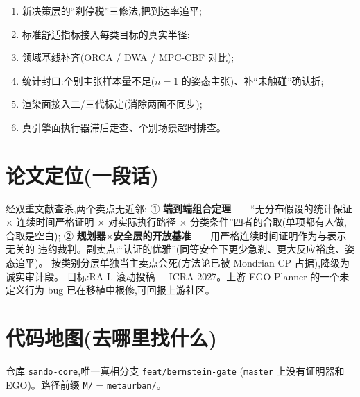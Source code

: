 \documentclass[11pt]{ctexart}
\newcommand{\code}[1]{\texttt{#1}}
\begin{document}
\begin{enumerate}
  \item 新决策层的``刹停税''三修法,把到达率追平;
  \item 标准舒适指标接入每类目标的真实半径;
  \item 领域基线补齐(ORCA / DWA / MPC-CBF 对比);
  \item 统计封口:个别主张样本量不足($n{=}1$ 的姿态主张)、补``未触碰''确认折;
  \item 渲染面接入二/三代标定(消除两面不同步);
  \item 真引擎面执行器滞后走查、个别场景超时排查。
\end{enumerate}

\section{论文定位(一段话)}

经双重文献查杀,两个卖点无近邻:
① \textbf{端到端组合定理}——``无分布假设的统计保证 $\times$ 连续时间严格证明
$\times$ 对实际执行路径 $\times$ 分类条件''四者的合取(单项都有人做,合取是空白);
② \textbf{规划器$\times$安全层的开放基准}——用严格连续时间证明作为与表示无关的
违约裁判。副卖点:``认证的优雅''(同等安全下更少急刹、更大反应裕度、姿态追平)。
按类别分层单独当主卖点会死(方法论已被 Mondrian CP 占据),降级为诚实审计段。
目标:RA-L 滚动投稿 + ICRA 2027。上游 EGO-Planner 的一个未定义行为 bug
已在移植中根修,可回报上游社区。

\section{代码地图(去哪里找什么)}

仓库 \code{sando-core},唯一真相分支 \code{feat/bernstein-gate}
(\code{master} 上没有证明器和 EGO)。路径前缀 \code{M/} = \code{metaurban/}。
\end{document}

